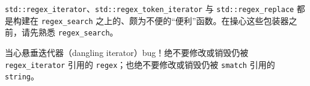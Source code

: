 \texttt{std::\allowbreak{}regex\_\allowbreak{}iterator}、\texttt{std::\allowbreak{}regex\_\allowbreak{}token\_\allowbreak{}iterator} 与 \texttt{std::\allowbreak{}regex\_\allowbreak{}replace} 都是构建在 \texttt{regex\_\allowbreak{}search} 之上的、颇为不便的“便利”函数。在操心这些包装器之前，请先熟悉 \texttt{regex\_\allowbreak{}search}。

当心悬垂迭代器（dangling iterator）bug！绝不要修改或销毁仍被 \texttt{regex\_\allowbreak{}iterator} 引用的 \texttt{regex}；也绝不要修改或销毁仍被 \texttt{smatch} 引用的 \texttt{string}。

